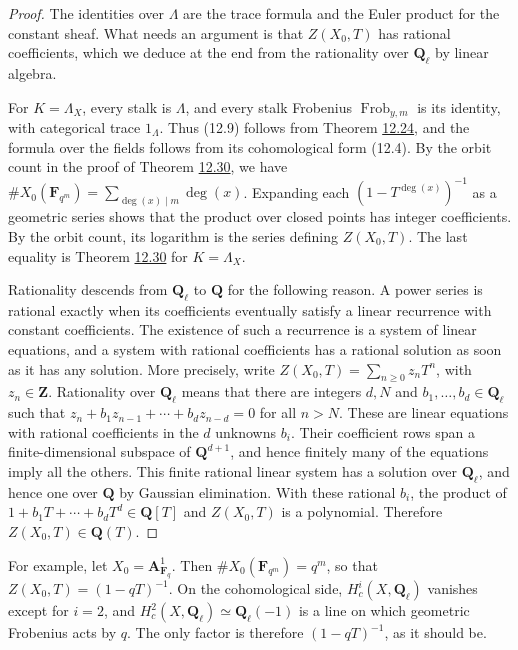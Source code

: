 \documentclass[11pt]{article}
\begin{document}
\begin{proof}[{Proof}]\label{bp96}%
The identities over \(\Lambda\) are the trace formula and the Euler product for the constant sheaf. What needs an argument is that \(Z(X_0,T)\) has rational coefficients, which we deduce at the end from the rationality over \(\mathbf Q_\ell\) by linear algebra.

For \(K=\Lambda_X\), every stalk is \(\Lambda\), and every stalk Frobenius \(\operatorname{Frob}_{y,m}\) is its identity, with categorical trace \(1_\Lambda\). Thus (12.9) follows from Theorem \hyperref[bp73]{12.24}, and the formula over the fields follows from its cohomological form (12.4). By the orbit count in the proof of Theorem \hyperref[bp92]{12.30}, we have \(\#X_0(\mathbf F_{q^m})=\sum_{\deg(x)\mid m}\deg(x)\). Expanding each \((1-T^{\deg(x)})^{-1}\) as a geometric series shows that the product over closed points has integer coefficients. By the orbit count, its logarithm is the series defining \(Z(X_0,T)\). The last equality is Theorem \hyperref[bp92]{12.30} for \(K=\Lambda_X\).

Rationality descends from \(\mathbf Q_\ell\) to \(\mathbf Q\) for the following reason. A power series is rational exactly when its coefficients eventually satisfy a linear recurrence with constant coefficients. The existence of such a recurrence is a system of linear equations, and a system with rational coefficients has a rational solution as soon as it has any solution. More precisely, write \(Z(X_0,T)=\sum_{n\geq0}z_nT^n\), with \(z_n\in\mathbf Z\). Rationality over \(\mathbf Q_\ell\) means that there are integers \(d,N\) and \(b_1,\ldots,b_d\in\mathbf Q_\ell\) such that \(z_n+b_1z_{n-1}+\cdots+b_dz_{n-d}=0\) for all \(n>N\). These are linear equations with rational coefficients in the \(d\) unknowns \(b_i\). Their coefficient rows span a finite-dimensional subspace of \(\mathbf Q^{d+1}\), and hence finitely many of the equations imply all the others. This finite rational linear system has a solution over \(\mathbf Q_\ell\), and hence one over \(\mathbf Q\) by Gaussian elimination. With these rational \(b_i\), the product of \(1+b_1T+\cdots+b_dT^d\in\mathbf Q[T]\) and \(Z(X_0,T)\) is a polynomial. Therefore \(Z(X_0,T)\in\mathbf Q(T)\).
\end{proof}

\label{bp97}%
For example, let \(X_0=\mathbf A^1_{\mathbf F_q}\). Then \(\#X_0(\mathbf F_{q^m})=q^m\), so that \(Z(X_0,T)=(1-qT)^{-1}\). On the cohomological side, \(H^i_c(X,\mathbf Q_\ell)\) vanishes except for \(i=2\), and \(H^2_c(X,\mathbf Q_\ell)\simeq\mathbf Q_\ell(-1)\) is a line on which geometric Frobenius acts by \(q\). The only factor is therefore \((1-qT)^{-1}\), as it should be.
\end{document}
